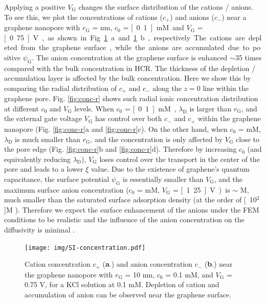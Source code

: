 \documentclass[journal=langd5,email=true, hyperref=true, keywords=false]{achemso}
\begin{document}
Applying a positive $V_{\mathrm{G}}$ changes the surface distribution
of the cations / anions. To see this, we plot the concentrations of
cations ($c_{+}$) and anions ($c_{-}$) near a graphene nanopore with
$r_{\mathrm{G}}$ = \unit[10]{nm}, $c_{0}$ = \unit[0.1]{mM} and $V_{\mathrm{G}}$ =
\unit[0.75]{V}, as shown in Fig. \ref{fig:conc}a and \ref{fig:conc}b,
respectively. The cations are depleted from the graphene surface,
while the anions are accumulated due to positive
$\psi_{\mathrm{G}}$. The anion concentration at the graphene surface
is enhanced $\sim{}$35 times compared with the bulk concentration in
HCR. The thickness of the depletion / accumulation layer is affected
by the bulk concentration. Here we show this by comparing the radial
distribution of $c_{+}$ and $c_{-}$ along the $z = 0$ line within the
graphene pore. Fig. \ref{fig:conc-r} shows such radial ionic
concentration distribution at different $c_{0}$ and $V_{\mathrm{G}}$
levels. When $c_{0}$ = \unit[0.1]{mM}, $\lambda_{\mathrm{D}}$ is larger than
$r_{\mathrm{G}}$, and the external gate voltage $V_{\mathrm{G}}$ has
control over both $c_{-}$ and $c_{+}$ within the graphene nanopore
(Fig. \ref{fig:conc-r}a and \ref{fig:conc-r}c). On the other
hand, when $c_{0}$ = \unit[100]{mM}, $\lambda_{\mathrm{D}}$ is much smaller
than $r_{\mathrm{G}}$, and the concentration is only affected by
$V_{\mathrm{G}}$ close to the pore edge (Fig. \ref{fig:conc-r}b
and \ref{fig:conc-r}d). Therefore by increasing $c_{0}$ (and
equivalently reducing $\lambda_{\mathrm{D}}$), $V_{\mathrm{G}}$ loses
control over the transport in the center of the pore and leads to a
lower $\xi$ value. Due to the existence of graphene's quantum
capacitance, the surface potential $\psi_{\mathrm{G}}$ is essentially
smaller than $V_{\mathrm{G}}$, and the maximum surface anion
concentration ($c_{0}$ = \unit[100]{mM}, $V_{\mathrm{G}}$ = \unit[1.25]{V}) is
$\sim{}$ \unit[3]{M}, much smaller than the saturated surface adsorption
density (at the order of \unit[10$^{2}$]{M}
\cite{bard_electrochemical_1980}). Therefore we expect the surface
enhancement of the anions under the FEM conditions to be realistic and
the influence of the anion concentration on the diffusivity is minimal
\cite{Tang_1999_I}.


\begin{figure}[htbp]
  \centering
  \texttt{[image: img/SI-concentration.pdf]}
  \caption{Cation concentration $c_{+}$ (\textbf{a}.) and anion
    concentration $c_{-}$ (\textbf{b}.) near the graphene nanopore
    with $r_{\mathrm{G}}$ = 10 nm, $c_{0}$ = 0.1 mM, and
    $V_{\mathrm{G}}$ = 0.75 V, for a KCl solution at 0.1
    mM. Depletion of cation and accumulation of anion can be observed
    near the graphene surface.}
  \label{fig:conc}
\end{figure}
\end{document}
